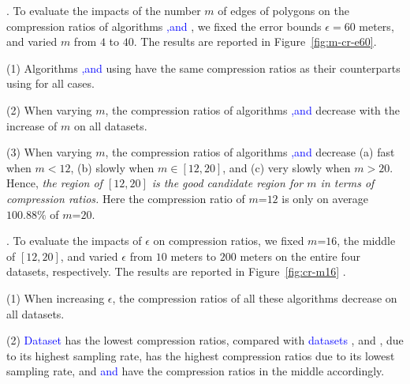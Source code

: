 .
To evaluate the impacts of   the number $m$ of edges of polygons on the
compression ratios of algorithms \textcolor{blue}{\cist ,\cista and \cisto}, we fixed the error bounds {$\epsilon =60$ meters}, and varied $m$ from $4$ to $40$. The results are reported in Figure~\ref{fig:m-cr-e60}.

\ni(1) Algorithms \textcolor{blue}{\cist ,\cista and \cisto} using \rpia have the same compression ratios as their counterparts using \cpia for all cases.

\ni(2) When varying $m$, the compression ratios of algorithms
\textcolor{blue}{\cist ,\cista and \cisto} decrease with the increase of $m$ on all datasets.

\ni(3) When varying $m$, the compression ratios of algorithms \textcolor{blue}{\cist ,\cista and \cisto} decrease (a) fast when $m < 12$, (b) slowly when $m \in [12, 20]$, and (c) very slowly when $m > 20$. Hence, \emph{the region of $[12, 20]$ is the good candidate region for $m$ in terms of compression ratios.}
Here the compression ratio of $m$=$12$ is only on average {$100.88\%$} of $m$=$20$.



.
To evaluate the impacts of $\epsilon$ on compression ratios, we fixed {$m$=$16$}, the middle of $[12, 20]$, and varied $\epsilon$ from $10$ meters to $200$ meters on the entire four datasets, respectively.
The results are reported in Figure~\ref{fig:cr-m16} .


\ni (1) When increasing $\epsilon$, the compression ratios of all these algorithms decrease on all datasets.

\ni (2) \textcolor{blue}{Dataset} \pricar has the lowest compression ratios, compared with \textcolor{blue}{datasets} \mopsi, \sercar and \geolife, due to its highest sampling rate,
\textcolor{blue}{\sercar} has the highest compression ratios due to its lowest sampling rate, and \textcolor{blue}{\geolife and \mopsi} have the compression ratios in the middle accordingly.

